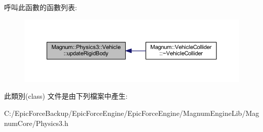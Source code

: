 呼叫此函數的函數列表\+:\nopagebreak
\begin{figure}[H]
\begin{center}
\leavevmode
\includegraphics[width=350pt]{class_magnum_1_1_physics3_1_1_vehicle_a4532094d2d5972827a6cc8a89677cfd5_icgraph}
\end{center}
\end{figure}




此類別(class) 文件是由下列檔案中產生\+:\begin{DoxyCompactItemize}
\item 
C\+:/\+Epic\+Force\+Backup/\+Epic\+Force\+Engine/\+Epic\+Force\+Engine/\+Magnum\+Engine\+Lib/\+Magnum\+Core/Physics3.\+h\end{DoxyCompactItemize}
